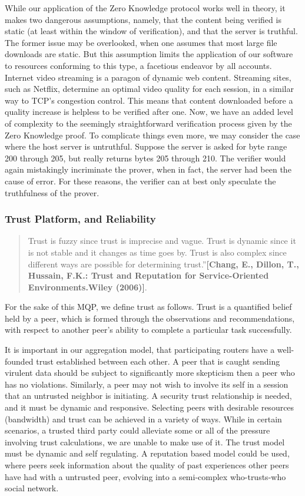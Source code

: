 \documentclass[12pt]{article}
\newcommand{\lcite}[1]
{{\bfseries\color{orange}[#1]}}
\begin{document}
		While our application of the Zero Knowledge protocol works well in theory, it makes two dangerous assumptions, namely, that the content being verified is static (at least within the window of verification), and that the server is truthful. The former issue may be overlooked, when one assumes that most large file downloads are static. But this assumption limits the application of our software to resources conforming to this type, a facetious endeavor by all accounts. Internet video streaming is a paragon of dynamic web content. Streaming sites, such as Netflix, determine an optimal video quality for each session, in a similar way to TCP's congestion control. This means that content downloaded before a quality increase is helpless to be verified after one. Now, we have an added level of complexity to the seemingly straightforward verification process given by the Zero Knowledge proof. To complicate things even more, we may consider the case where the host server is untruthful. Suppose the server is asked for byte range 200 through 205, but really returns bytes 205 through 210. The verifier would again mistakingly incriminate the prover, when in fact, the server had been the cause of error. For these reasons, the verifier can at best only speculate the truthfulness of the prover.

		\subsubsection{Trust Platform, and Reliability}

			\begin{quote}
			\centering
			Trust is fuzzy since trust is imprecise and vague. Trust is dynamic since it is not stable and it changes as time goes by. Trust is also complex since different ways are possible for determining trust.''\lcite{Chang, E., Dillon, T., Hussain, F.K.: Trust and Reputation for Service-Oriented Environments.Wiley (2006)}. 
			\end{quote}

			For the sake of this MQP, we define trust as follows. Trust is a quantified belief held by a peer, which is formed through the observations and recommendations, with respect to another peer’s ability to complete a particular task successfully. 

			It is important in our aggregation model, that participating routers have a well-founded trust established between each other. A peer that is caught sending virulent data should be subject to significantly more skepticism then a peer who has no violations. Similarly, a peer may not wish to involve its self in a session that an untrusted neighbor is initiating. A security trust relationship is needed, and it must be dynamic and responsive. Selecting peers with desirable resources (bandwidth) and trust can be achieved in a variety of ways. While in certain scenarios, a trusted third party could alleviate some or all of the pressure involving trust calculations, we are unable to make use of it. The trust model must be dynamic and self regulating. A reputation based model could be used, where peers seek information about the quality of past experiences other peers have had with a untrusted peer, evolving into a semi-complex who-trusts-who social network.
\end{document}
